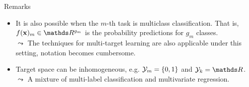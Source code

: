 \documentclass[11pt,compress,t,notes=noshow, xcolor=table]{beamer}
\begin{document}
\begin{frame}{Remarks}

		\begin{itemize}
            \item It is also possible when the $m$-th task is multiclass classification. That is, $f(\xv)_m \in \R^{g_m}$ is the probability predictions for $g_m$ classes. \\
            $\leadsto$ The techniques for multi-target learning are also applicable under this setting, notation becomes cumbersome.

            \item Target space can be inhomogeneous, e.g. $\mathcal{Y}_m = \{0, 1\}$ and $\Yspace_k = \R$. \\
            $\leadsto$ A mixture of multi-label classification and multivariate regression.
            
		\end{itemize}

\end{frame}


\end{document}
